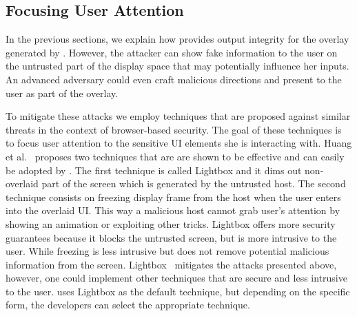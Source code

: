 \subsection{Focusing User Attention}
\label{sec:systemDesign:userAttention}

In the previous sections, we explain how \name provides output integrity for the overlay generated by \device. However, the attacker can show fake information to the user on the untrusted part of the display space that may potentially influence her inputs. An advanced adversary could even craft malicious directions and present to the user as part of the overlay.


To mitigate these attacks we employ techniques that are proposed against similar threats in the context of browser-based security. The goal of these techniques is to focus user attention to the sensitive UI elements she is interacting with. Huang et al.~\cite{huang2012clickjacking} proposes two techniques that are are shown to be effective and can easily be adopted by \device.
The first technique is called Lightbox and it dims out non-overlaid part of the screen which is generated by the untrusted host. The second technique consists on freezing display frame from the host when the user enters into the overlaid UI. This way a malicious host cannot grab user's attention by showing an animation or exploiting other tricks.
Lightbox offers more security guarantees because it blocks the untrusted screen, but is more intrusive to the user. While freezing is less intrusive but does not remove potential malicious information from the screen.
Lightbox~\cite{huang2012clickjacking} mitigates the attacks presented above, however, one could implement other techniques that are secure and less intrusive to the user.
\device uses Lightbox as the default technique, but depending on the specific form, the developers can select the appropriate technique.

